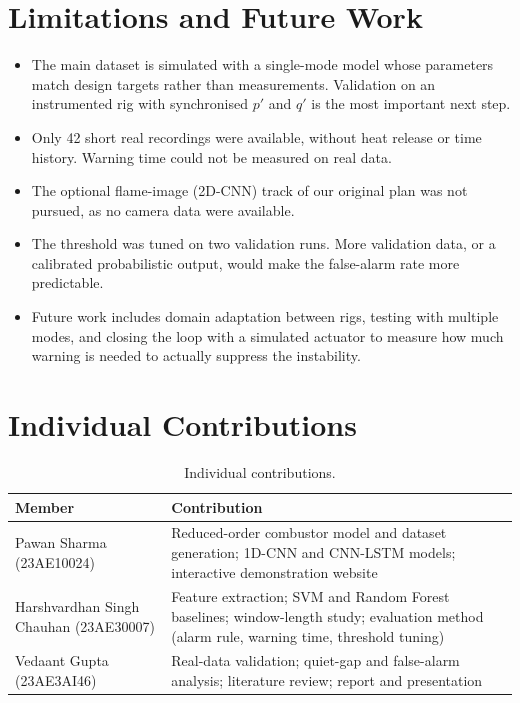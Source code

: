 \documentclass[11pt,a4paper]{article}
\newcommand{\pp}{p'}
\newcommand{\qq}{q'}
\begin{document}
\section{Limitations and Future Work}
\begin{itemize}
  \item The main dataset is simulated with a single-mode model whose parameters match design targets rather than measurements. Validation on an instrumented rig with synchronised $\pp$ and $\qq$ is the most important next step.
  \item Only 42 short real recordings were available, without heat release or time history. Warning time could not be measured on real data.
  \item The optional flame-image (2D-CNN) track of our original plan was not pursued, as no camera data were available.
  \item The threshold was tuned on two validation runs. More validation data, or a calibrated probabilistic output, would make the false-alarm rate more predictable.
  \item Future work includes domain adaptation between rigs, testing with multiple modes, and closing the loop with a simulated actuator to measure how much warning is needed to actually suppress the instability.
\end{itemize}

\section{Individual Contributions}
\begin{table}[H]\centering\small
\caption{Individual contributions.}\label{tab:contrib}
\begin{tabular}{L{4.6cm}L{10cm}}\toprule
Member & Contribution\\\midrule
Pawan Sharma (23AE10024) & Reduced-order combustor model and dataset generation; 1D-CNN and CNN-LSTM models; interactive demonstration website\\
Harshvardhan Singh Chauhan (23AE30007) & Feature extraction; SVM and Random Forest baselines; window-length study; evaluation method (alarm rule, warning time, threshold tuning)\\
Vedaant Gupta (23AE3AI46) & Real-data validation; quiet-gap and false-alarm analysis; literature review; report and presentation\\
\bottomrule\end{tabular}
\end{table}
\end{document}
